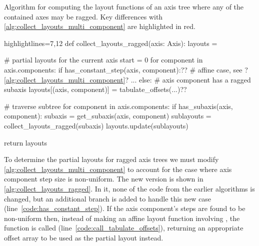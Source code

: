 \documentclass[thesis]{subfiles}
\begin{document}
\begin{algorithm}
  \caption{
    Algorithm for computing the layout functions of an axis tree where any of the contained axes may be ragged.
    Key differences with \cref{alg:collect_layouts_multi_component} are highlighted in red.
  }

  \begin{center}
    \begin{minipage}{.9\textwidth}
      \begin{pyalg2*}{highlightlines={7,12}}
        def collect_layouts_ragged(axis: Axis):
          layouts = {}

          # partial layouts for the current axis
          start = 0
          for component in axis.components:
            if has_constant_step(axis, component):?\label{code:has_constant_step}?
              # affine case, see ?\cref{alg:collect_layouts_multi_component}?
              ...
            else:
              # axis component has a ragged subaxis
              layouts[(axis, component)] = tabulate_offsets(...)?\label{code:call_tabulate_offsets}?

          # traverse subtree
          for component in axis.components:
            if has_subaxis(axis, component): 
              subaxis = get_subaxis(axis, component)
              sublayouts = collect_layouts_ragged(subaxis)
              layouts.update(sublayouts)

          return layouts
      \end{pyalg2*}
    \end{minipage}
  \end{center}
  \label{alg:collect_layouts_ragged}
\end{algorithm}

To determine the partial layouts for ragged axis trees we must modify \cref{alg:collect_layouts_multi_component} to account for the case where axis component step size is non-uniform.
The new version is shown in \cref{alg:collect_layouts_ragged}.
In it, none of the code from the earlier algorithms is changed, but an additional branch is added to handle this new case (line~\ref{code:has_constant_step}).
If the axis component's steps are found to be non-uniform then, instead of making an affine layout function involving , the function  is called (line~\ref{code:call_tabulate_offsets}), returning an appropriate offset array to be used as the partial layout instead.
\end{document}
